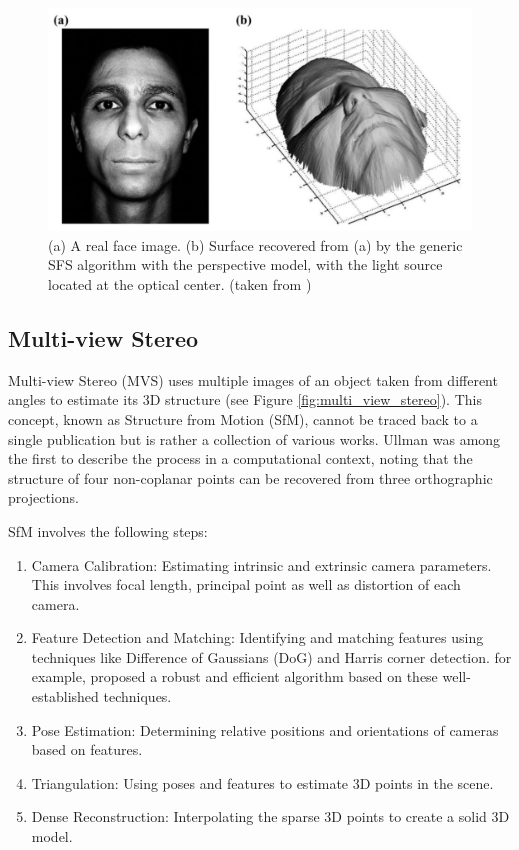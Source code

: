 \begin{figure}
    \centering
    \includegraphics[width=0.9\linewidth]{images/shape_from_shading.jpg}
    \caption{(a) A real face image. (b) Surface recovered from (a) by the generic SFS algorithm with the perspective model, with the light source located at the optical center. (taken from \textcite{he_advances_2018})}
    \label{fig:shape_from_shading}
\end{figure}

\subsection{Multi-view Stereo}
Multi-view Stereo (MVS) uses multiple images of an object taken from different angles to estimate its 3D structure (see Figure \ref{fig:multi_view_stereo}). This concept, known as Structure from Motion (SfM), cannot be traced back to a single publication but is rather a collection of various works.
Ullman \autocite{ullman_interpretation_1997} was among the first to describe the process in a computational context, noting that the structure of four non-coplanar points can be recovered from three orthographic projections.

SfM involves the following steps:

\begin{enumerate}
    \item Camera Calibration: Estimating intrinsic and extrinsic camera parameters. This involves focal length, principal point as well as distortion of each camera.
    \item Feature Detection and Matching: Identifying and matching features using techniques like Difference of Gaussians (DoG) and Harris corner detection. \textcite{furukawa_accurate_2010} for example, proposed a robust and efficient algorithm based on these well-established techniques.
    \item Pose Estimation: Determining relative positions and orientations of cameras based on features.
    \item Triangulation: Using poses and features to estimate 3D points in the scene.
    \item Dense Reconstruction: Interpolating the sparse 3D points to create a solid 3D model.
\end{enumerate}


